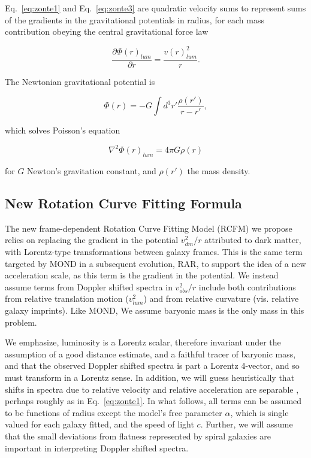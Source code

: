 \documentclass[reprint,%
 amsmath,amssymb,
 aps,
]{revtex4-1}
\begin{document}
    Eq.~\ref{eq:zonte1} and Eq.~\ref{eq:zonte3} are quadratic velocity   sums to represent  sums of the  gradients in the gravitational potentials in radius, 
 for each mass contribution obeying the  central gravitational    force law   

\begin{equation}
 \frac{\partial \Phi(r)_{lum}}{\partial r}    =\frac{v(r)_{lum}^2}{r}.   
    \label{zoochance1}
\end{equation}

  
The   Newtonian gravitational potential is

\begin{equation}
      \Phi(r)  = -G \int d^3r'  \frac{ \rho(r') }{r-r'} ,
      \label{eq:Newt}
      \end{equation}

which solves Poisson's equation

\begin{equation}
\nabla^2 \Phi(r)_{lum}  = 4\pi G \rho(r)   
    \label{whatsgood}
\end{equation}

 for $G$  Newton's   gravitation constant, and 
$\rho(r')$  the mass density. 
  



\subsection{New Rotation Curve Fitting Formula}

 The  new 
frame-dependent Rotation Curve Fitting Model (RCFM) we propose relies on 
replacing the gradient in the potential    $v^2_{dm}/r$  attributed to   dark matter,  with  Lorentz-type transformations between galaxy frames.  This is the same term targeted by MOND in a subsequent evolution, RAR, to support the idea of a new acceleration scale, as this term is the gradient in the potential. 
 We  instead   assume terms from Doppler shifted spectra in $v^2_{obs}/r$ include both contributions from relative translation motion ($v^2_{lum}$) and from relative curvature (vis. relative galaxy imprints). 
 Like MOND, We assume baryonic mass is the only mass in this problem.
 
We emphasize,  luminosity   is a Lorentz scalar, therefore invariant under the assumption of a good distance estimate, and   a faithful tracer of baryonic mass, and that    the observed   
   Doppler shifted spectra is part  a Lorentz 4-vector, and so    must transform in a Lorentz sense. 
In addition, we will 
   guess  heuristically that shifts in   spectra   due to relative velocity and relative acceleration are separable \cite{Jack,Cisn}, perhaps roughly  as in Eq.~\ref{eq:zonte1}.
  In what follows, all   terms  can be assumed to  be functions of radius except the model's free parameter $\alpha$,  which is single valued for each galaxy fitted, and the speed of light $c$.  Further, we will assume that the small deviations from flatness represented by spiral  galaxies are important in interpreting Doppler shifted spectra. 
   
\end{document}
